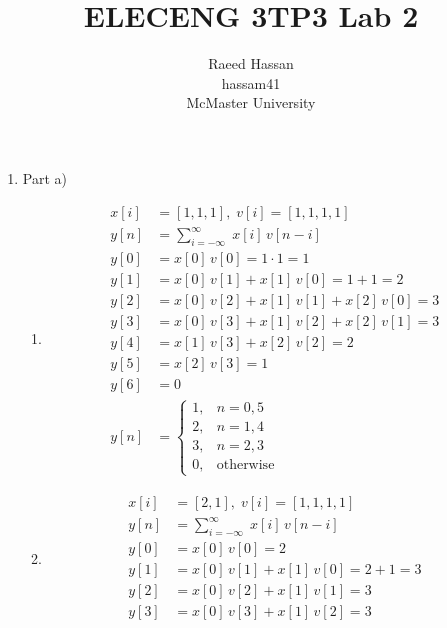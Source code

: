 \documentclass[12pt]{article}
\title{ELECENG 3TP3 Lab 2}
\author{Raeed Hassan \\ hassam41 \\ McMaster University}
\begin{document}
\maketitle
\pagebreak
\begin{enumerate}
    \item 
    Part a)
    \begin{enumerate}
        \item
        \begin{equation*}
        \begin{aligned}
            x[i] &= [1,1,1],\; v[i] = [1,1,1,1] \\
            y[n] &= \sum_{i=-\infty}^{\infty} \; x[i] \, v[n-i] \\
            y[0] &= x[0] \, v[0] = 1\cdot1 = 1 \\
            y[1] &= x[0] \, v[1] + x[1] \, v[0] = 1 + 1 = 2 \\
            y[2] &= x[0] \, v[2] + x[1] \, v[1] + x[2] \, v[0] = 3 \\
            y[3] &= x[0] \, v[3] + x[1] \, v[2] + x[2] \, v[1] = 3 \\
            y[4] &= x[1] \, v[3] + x[2] \, v[2] = 2 \\
            y[5] &= x[2] \, v[3] = 1 \\
            y[6] &= 0 \\
            y[n] &= \begin{cases}
                1, & n=0,5 \\
                2, & n=1,4 \\
                3, & n=2,3 \\
                0, & \text{otherwise}
            \end{cases}
        \end{aligned}
        \end{equation*}
        \item
        \begin{equation*}
            \begin{aligned}
                x[i] &= [2,1],\; v[i] = [1,1,1,1] \\
                y[n] &= \sum_{i=-\infty}^{\infty} \; x[i] \, v[n-i] \\
                y[0] &= x[0] \, v[0] = 2 \\
                y[1] &= x[0] \, v[1] + x[1] \, v[0] = 2 + 1 = 3 \\
                y[2] &= x[0] \, v[2] + x[1] \, v[1] = 3 \\
                y[3] &= x[0] \, v[3] + x[1] \, v[2] = 3 \\

\end{aligned}
\end{equation*}
\end{enumerate}
\end{enumerate}
\end{document}

